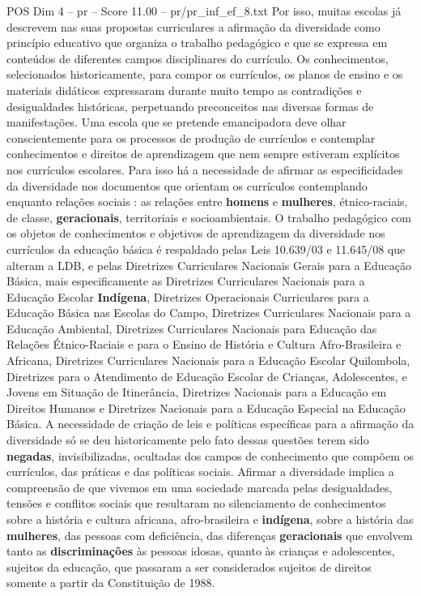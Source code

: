 \begin{textsample}{POS Dim 4 – pr – Score 11.00 – pr/pr\_inf\_ef\_8.txt}
Por isso, muitas escolas já descrevem nas suas propostas curriculares a afirmação da diversidade como princípio educativo que organiza o trabalho pedagógico e que se expressa em conteúdos de diferentes campos disciplinares do currículo.
Os conhecimentos, selecionados historicamente, para compor os currículos, os planos de ensino e os materiais didáticos expressaram durante muito tempo as contradições e desigualdades históricas, perpetuando preconceitos nas diversas formas de manifestações.
Uma escola que se pretende emancipadora deve olhar conscientemente para os processos de produção de currículos e contemplar conhecimentos e direitos de aprendizagem que nem sempre estiveram explícitos nos currículos escolares.
Para isso há a necessidade de afirmar as especificidades da diversidade nos documentos que orientam os currículos contemplando enquanto relações sociais : as relações entre \textbf{homens} e \textbf{mulheres}, étnico-raciais, de classe, \textbf{geracionais}, territoriais e socioambientais.
O trabalho pedagógico com os objetos de conhecimentos e objetivos de aprendizagem da diversidade nos currículos da educação básica é respaldado pelas Leis 10.639/03 e 11.645/08 que alteram a LDB, e pelas Diretrizes Curriculares Nacionais Gerais para a Educação Básica, mais especificamente as Diretrizes Curriculares Nacionais para a Educação Escolar \textbf{Indígena}, Diretrizes Operacionais Curriculares para a Educação Básica nas Escolas do Campo, Diretrizes Curriculares Nacionais para a Educação Ambiental, Diretrizes Curriculares Nacionais para Educação das Relações Étnico-Raciais e para o Ensino de História e Cultura Afro-Brasileira e Africana, Diretrizes Curriculares Nacionais para a Educação Escolar Quilombola, Diretrizes para o Atendimento de Educação Escolar de Crianças, Adolescentes, e Jovens em Situação de Itinerância, Diretrizes Nacionais para a Educação em Direitos Humanos e Diretrizes Nacionais para a Educação Especial na Educação Básica.
A necessidade de criação de leis e políticas específicas para a afirmação da diversidade só se deu historicamente pelo fato dessas questões terem sido \textbf{negadas}, invisibilizadas, ocultadas dos campos de conhecimento que compõem os currículos, das práticas e das políticas sociais.
Afirmar a diversidade implica a compreensão de que vivemos em uma sociedade marcada pelas desigualdades, tensões e conflitos sociais que resultaram no silenciamento de conhecimentos sobre a história e cultura africana, afro-brasileira e \textbf{indígena}, sobre a história das \textbf{mulheres}, das pessoas com deficiência, das diferenças \textbf{geracionais} que envolvem tanto as \textbf{discriminações} às pessoas idosas, quanto às crianças e adolescentes, sujeitos da educação, que passaram a ser considerados sujeitos de direitos somente a partir da Constituição de 1988.

\end{textsample}
